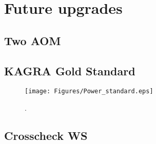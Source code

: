 
\chapter{Future upgrades} %

\label{Chapter7} %
\section{Two AOM}
\section{KAGRA Gold Standard}

\begin{figure}
\begin{center}
\texttt{[image: Figures/Power\_standard.eps]}
\caption{.} 
\label{fig:Power_standard} 
\end{center}
\end{figure}

\section{Crosscheck WS}
